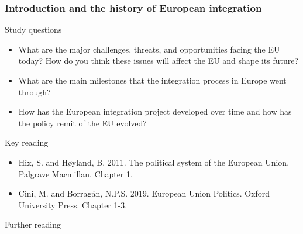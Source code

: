 
\subsubsection*{Introduction and the history of European integration}

Study questions

\begin{itemize}
	\item What are the major challenges, threats, and opportunities facing the EU today? How do you think these issues will affect the EU and shape its future?
	\item What are the main milestones that the integration process in Europe went through? 
	\item How has the European integration project developed over time and how has the policy remit of the EU evolved?
\end{itemize}

\noindent Key reading

\begin{itemize}
	\item Hix, S. and H\o yland, B. 2011. The political system of the European Union. Palgrave Macmillan. Chapter 1.
	\item Cini, M. and Borragán, N.P.S. 2019. European Union Politics. Oxford University Press. Chapter 1-3.
\end{itemize}

\noindent Further reading


